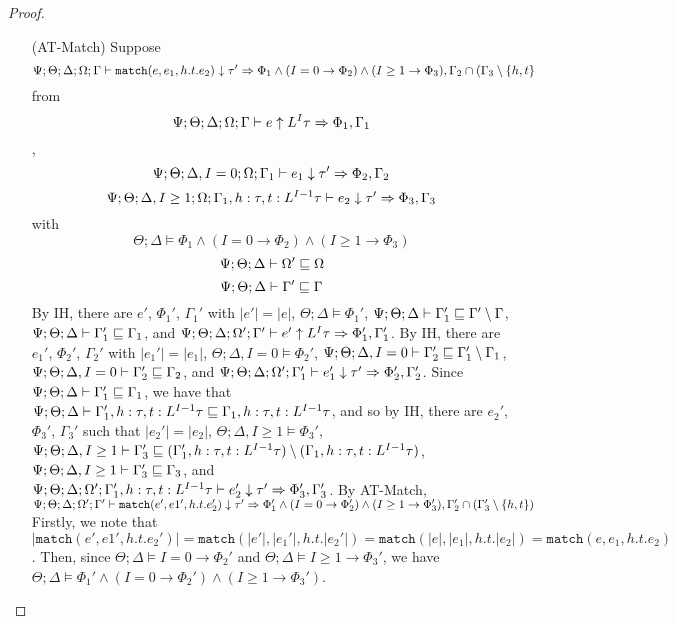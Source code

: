 \begin{proof}
\begin{itemize}
  \item[(AT-Match)] Suppose 
   $$\Psi ; \Theta ; \Delta ; \Omega ; \Gamma\vdash \texttt{match}(e,e_1,h.t.e_2) \downarrow \tau' \Rightarrow \Phi_1 \wedge (I = 0 \to \Phi_2) \wedge (I \geq 1 \to \Phi_3), \Gamma_2 \cap (\Gamma_3 \setminus \{h,t\}$$ from 
   $$\Psi ; \Theta ; \Delta ; \Omega ; \Gamma\vdash e \uparrow L^I \tau \Rightarrow \Phi_1, \Gamma_1$$,
   $$\Psi ; \Theta ; \Delta, I = 0 ; \Omega ; \Gamma_1\vdash e_1 \downarrow \tau' \Rightarrow \Phi_2,\Gamma_2$$
   $$\Psi ; \Theta ; \Delta, I \geq 1; \Omega ; \Gamma_1, h : \tau, t : L^{I-1} \tau \vdash e_2 \downarrow \tau' \Rightarrow \Phi_3,\Gamma_3$$ with 
   $$\Theta ; \Delta \vDash \Phi_1 \wedge (I = 0 \to \Phi_2) \wedge (I \geq 1 \to \Phi_3)$$
   $$\Psi ; \Theta ; \Delta \vdash \Omega' \sqsubseteq \Omega$$
   $$\Psi ; \Theta ; \Delta \vdash \Gamma' \sqsubseteq \Gamma$$
   By IH, there are $e'$, $\Phi_1'$, $\Gamma_1'$ with $|e'| = |e|$, 
   $\Theta ; \Delta \vDash \Phi_1'$,
   $\Psi ; \Theta ; \Delta \vdash \Gamma_1' \sqsubseteq \Gamma' \setminus \Gamma$,
   $\Psi ; \Theta ; \Delta \vdash \Gamma_1' \sqsubseteq \Gamma_1$, and
   $\Psi ; \Theta ; \Delta ; \Omega' ; \Gamma' \vdash e' \uparrow L^I \tau \Rightarrow \Phi_1',\Gamma_1'$.
   By IH, there are $e_1'$, $\Phi_2'$, $\Gamma_2'$ with $|e_1'| = |e_1|$,
   $\Theta ; \Delta, I = 0 \vDash \Phi_2'$,
   $\Psi ; \Theta ; \Delta, I = 0 \vdash \Gamma_2' \sqsubseteq \Gamma_1' \setminus \Gamma_1$,
   $\Psi ; \Theta ; \Delta, I = 0 \vdash \Gamma_2' \sqsubseteq \Gamma_2$, and
   $\Psi ; \Theta ; \Delta ; \Omega' ; \Gamma_1' \vdash e_1' \downarrow \tau' \Rightarrow \Phi_2',\Gamma_2'$.
   Since $\Psi ; \Theta ; \Delta \vdash \Gamma_1' \sqsubseteq \Gamma_1$, we have that
      $\Psi ; \Theta ; \Delta \vdash \Gamma_1', h : \tau, t : L^{I-1} \tau \sqsubseteq \Gamma_1, h : \tau, t : L^{I-1} \tau$,
   and so by IH, there are $e_2'$, $\Phi_3'$, $\Gamma_3'$ such that $|e_2'| = |e_2|$,
   $\Theta ; \Delta, I \geq 1 \vDash \Phi_3'$,
   $\Psi ; \Theta ; \Delta, I \geq 1 \vdash \Gamma_3' \sqsubseteq (\Gamma_1',h : \tau, t : L^{I-1} \tau) \setminus (\Gamma_1, h : \tau, t : L^{I-1} \tau)$,
   $\Psi ; \Theta ; \Delta, I \geq 1 \vdash \Gamma_3' \sqsubseteq \Gamma_3$, and
   $\Psi ; \Theta ; \Delta ; \Omega' ; \Gamma_1', h : \tau, t : L^{I-1} \tau \vdash e_2' \downarrow \tau' \Rightarrow \Phi_3',\Gamma_3'$.
   By AT-Match, $\Psi ; \Theta ; \Delta ; \Omega' ; \Gamma' \vdash \texttt{match}(e',e1',h.t.e_2') \downarrow \tau' \Rightarrow \Phi_1' \wedge (I = 0 \to \Phi_2') \wedge (I \geq 1 \to \Phi_3'),\Gamma_2' \cap (\Gamma_3' \setminus \{h,t\})$
   Firstly, we note that $|\texttt{match}(e',e1',h.t.e_2')| = \texttt{match}(|e'|,|e_1'|,h.t.|e_2'|) = \texttt{match}(|e|,|e_1|,h.t.|e_2|) = \texttt{match}(e,e_1,h.t.e_2)$. Then, since $\Theta ; \Delta \vDash I = 0 \to \Phi_2'$ and $\Theta ; \Delta \vDash I \geq 1 \to \Phi_3'$, we have $\Theta ; \Delta \vDash \Phi_1' \wedge (I = 0 \to \Phi_2') \wedge (I \geq 1 \to \Phi_3')$.

\end{itemize}
\end{proof}
